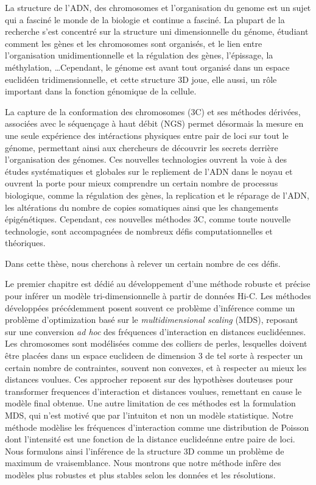 \begin{resumes}

La structure de l'ADN, des chromosomes et l'organisation du genome est un
sujet qui a fasciné le monde de la biologie et continue a fasciné. La plupart
de la recherche s'est concentré sur la structure uni dimensionnelle du génome,
étudiant comment les gènes et les chromosomes sont organisés, et le lien entre
l'organisation unidimentionnelle et la régulation des gènes, l'épissage, la
méthylation, \dots Cependant, le génome est avant tout organisé dans un espace
euclidéen tridimensionnelle, et cette structure 3D joue, elle aussi, un rôle
important dans la fonction génomique de la cellule.

La capture de la conformation des chromosomes (3C) et ses méthodes dérivées,
associées avec le séquençage à haut débit (NGS) permet désormais la mesure en
une seule expérience des intéractions physiques entre pair de loci sur tout le
génome, permettant ainsi aux chercheurs de découvrir les secrets derrière
l'organisation des génomes. Ces nouvelles technologies ouvrent la voie à des
études systématiques et globales sur le repliement de l'ADN dans le noyau et
ouvrent la porte pour mieux comprendre un certain nombre de processus
biologique, comme la régulation des gènes, la replication et le réparage de
l'ADN, les altérations du nombre de copies somatiques ainsi que les
changements épigénétiques. Cependant, ces nouvelles méthodes 3C, comme
toute nouvelle technologie, sont accompagnées de nombreux défis
computationnelles et théoriques.

Dans cette thèse, nous cherchons à relever un certain nombre de ces défis.

Le premier chapitre est dédié au développement d'une méthode robuste et
précise pour inférer un modèle tri-dimensionnelle à partir de données Hi-C.
Les méthodes développées précédemment posent souvent ce problème d'inférence
comme un problème d'optimization basé sur le {\em multidimensional scaling}
(MDS), reposant sur une conversion {\em ad hoc} des fréquences d'interaction
en distances euclidéennes. Les chromosomes sont modélisées comme des colliers
de perles, lesquelles doivent être placées dans un espace euclideen de
dimension 3 de tel sorte à respecter un certain nombre de contraintes, souvent
non convexes, et à respecter au mieux les distances voulues. Ces approcher
reposent sur des hypothèses douteuses pour transformer frequences
d'interaction et distances voulues, remettant en cause le modèle final
obtenue. Une autre limitation de ces méthodes est la formulation MDS, qui
n'est motivé que par l'intuiton et non un modèle statistique. Notre méthode
modèlise les fréquences d'interaction comme une distribution de Poisson dont
l'intensité est une fonction de la distance euclideénne entre paire de loci.
Nous formulons ainsi l'inférence de la structure 3D comme un problème de
maximum de vraisemblance. Nous montrons que notre méthode infère des modèles
plus robustes et plus stables selon les données et les résolutions.


\end{resumes}
